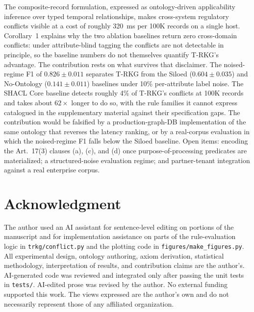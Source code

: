 \documentclass{ieeeaccess}
\begin{document}
The composite-record formulation, expressed as ontology-driven applicability inference over typed temporal relationships, makes cross-system regulatory conflicts visible at a cost of roughly 320~ms per 100K records on a single host. Corollary~1 explains why the two ablation baselines return zero cross-domain conflicts: under attribute-blind tagging the conflicts are not detectable in principle, so the baseline numbers do not themselves quantify T-RKG's advantage. The contribution rests on what survives that disclaimer. The noised-regime F1 of $0.826 \pm 0.011$ separates T-RKG from the Siloed ($0.604 \pm 0.035$) and No-Ontology ($0.141 \pm 0.011$) baselines under 10\% per-attribute label noise. The SHACL Core baseline detects roughly 4\% of T-RKG's conflicts at 100K records and takes about $62\times$ longer to do so, with the rule families it cannot express catalogued in the supplementary material against their specification gaps. The contribution would be falsified by a production-graph-DB implementation of the same ontology that reverses the latency ranking, or by a real-corpus evaluation in which the noised-regime F1 falls below the Siloed baseline. Open items: encoding the Art.~17(3) clauses (a), (c), and (d) once purpose-of-processing predicates are materialized; a structured-noise evaluation regime; and partner-tenant integration against a real enterprise corpus.

\section*{Acknowledgment}

The author used an AI assistant for sentence-level editing on portions of the manuscript and for implementation assistance on parts of the rule-evaluation logic in \texttt{trkg/conflict.py} and the plotting code in \texttt{figures/make\_figures.py}. All experimental design, ontology authoring, axiom derivation, statistical methodology, interpretation of results, and contribution claims are the author's. AI-generated code was reviewed and integrated only after passing the unit tests in \texttt{tests/}. AI-edited prose was revised by the author. No external funding supported this work. The views expressed are the author's own and do not necessarily represent those of any affiliated organization.
\end{document}
